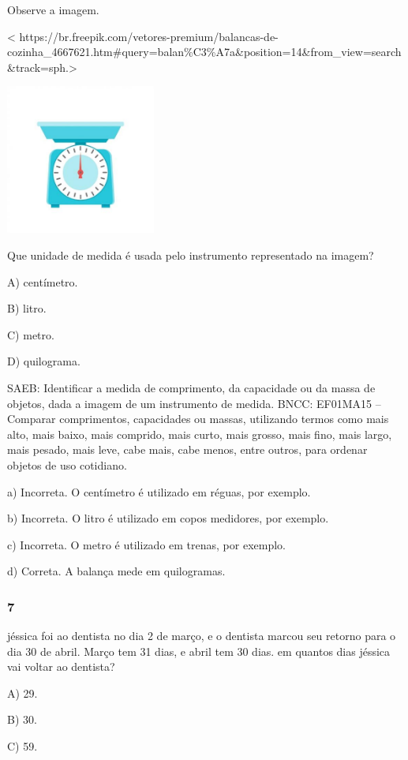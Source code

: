 Observe a imagem.

\textless{}
https://br.freepik.com/vetores-premium/balancas-de-cozinha\_4667621.htm\#query=balan\%C3\%A7a\&position=14\&from\_view=search\&track=sph.\textgreater{}

\includegraphics[width=1.93750in,height=1.93750in]{media/image114.jpg}

Que unidade de medida é usada pelo instrumento representado na imagem?

A) centímetro.

B) litro.

C) metro.

D) quilograma.

SAEB: Identificar a medida de comprimento, da capacidade ou da
massa de objetos, dada a imagem de um instrumento de medida.
BNCC: EF01MA15 -- Comparar comprimentos, capacidades ou massas,
utilizando termos como mais alto, mais baixo, mais comprido, mais curto,
mais grosso, mais fino, mais largo, mais pesado, mais leve, cabe mais,
cabe menos, entre outros, para ordenar objetos de uso cotidiano.

a) Incorreta. O centímetro é utilizado em réguas, por exemplo.

b) Incorreta. O litro é utilizado em copos medidores, por exemplo.

c) Incorreta. O metro é utilizado em trenas, por exemplo.

d) Correta. A balança mede em quilogramas.

\subsubsection{7}\label{section-108}

jéssica foi ao dentista no dia 2 de março, e o dentista marcou seu
retorno para o dia 30 de abril. Março tem 31 dias, e abril tem 30 dias. em quantos dias jéssica vai voltar ao dentista?

A) 29.

B) 30.

C) 59.

